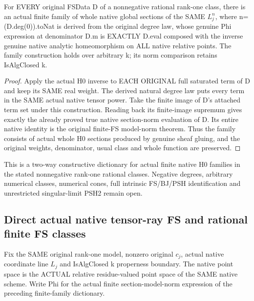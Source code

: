 \begin{theorem}
\label{thm:seven-original-fs-to-actual-finite-family}
\leanok
For EVERY original FSData D of a nonnegative rational rank-one class,
there is an actual finite family of whole native global sections of the
SAME $L_j^n$, where n=(D.deg(0)).toNat is derived from the original degree
law, whose genuine Phi expression at denominator D.m is EXACTLY
D.eval composed with the inverse genuine native analytic homeomorphism
on ALL native relative points. The family construction holds over
arbitrary k; its norm comparison retains IsAlgClosed k.
\end{theorem}
\begin{proof}
Apply the actual H0 inverse to EACH ORIGINAL full saturated term of D
and keep its SAME real weight. The derived natural degree
law puts every term in the SAME actual native tensor power. Take the
finite image of D's attached term set under this construction. Reading
back its finite-image supremum gives exactly the already proved true
native section-norm evaluation of D. Its entire native identity is the
original finite-FS model-norm theorem. Thus the family consists of actual
whole H0 sections produced by genuine sheaf gluing, and the original
weights, denominator, usual class and whole function are preserved.
\end{proof}

This is a two-way constructive dictionary for actual finite native H0
families in the stated nonnegative rank-one rational classes. Negative
degrees, arbitrary numerical classes, numerical cones, full intrinsic
FS/BJ/PSH identification and unrestricted singular-limit PSH2 remain open.

\subsection{Direct actual native tensor-ray FS and rational finite FS classes}
Fix the SAME original rank-one model, nonzero original $c_j$, actual native
coordinate line $L_j$ and IsAlgClosed k properness boundary. The native
point space is the ACTUAL relative residue-valued point space of the SAME
native scheme. Write Phi for the actual finite section-model-norm
expression of the preceding finite-family dictionary.

